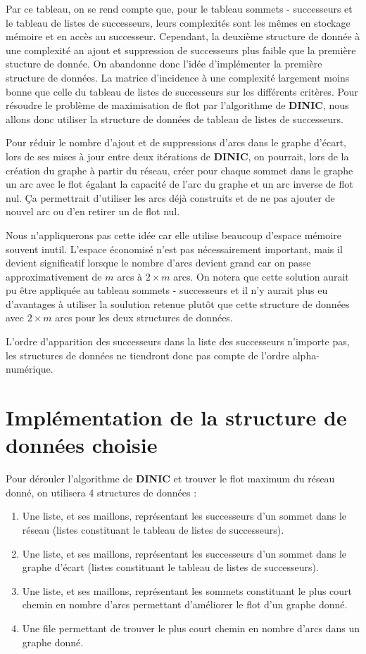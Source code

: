 \documentclass[11pt, a4paper]{report}
\begin{document}
	Par ce tableau, on se rend compte que, pour le tableau sommets - successeurs et le tableau de listes de successeurs, leurs complexités sont les mêmes en stockage mémoire et en accès au successeur. Cependant, la deuxième structure de donnée à une complexité an ajout et suppression de successeurs plus faible que la première stucture de donnée. On abandonne donc l'idée d'implémenter la première structure de données. La matrice d'incidence à une complexité largement moins bonne que celle du tableau de listes de successeurs sur les différents critères. Pour résoudre le problème de maximisation de flot par l'algorithme de \textbf{DINIC}, nous allons donc utiliser la structure de données de tableau de listes de successeurs.

    Pour réduir le nombre d'ajout et de suppressions d'arcs dans le graphe d'écart, lors de ses mises à jour entre deux itérations de \textbf{DINIC}, on pourrait, lors de la création du graphe à partir du réseau, créer pour chaque sommet dans le graphe un arc avec le flot égalant la capacité de l'arc du graphe et un arc inverse de flot nul. Ça permettrait d'utiliser les arcs déjà construits et de ne pas ajouter de nouvel arc ou d'en retirer un de flot nul.

    Nous n'appliquerons pas cette idée car elle utilise beaucoup d'espace mémoire souvent inutil. L'espace économisé n'est pas nécessairement important, mais il devient significatif lorsque le nombre d'arcs devient grand car on passe approximativement de $m$ arcs à $2 \times m$ arcs. On notera que cette solution aurait pu être appliquée au tableau sommets - successeurs et il n'y aurait plus eu d'avantages à utiliser la soulution retenue plutôt que cette structure de données avec $2 \times m$ arcs pour les deux structures de données.

    L'ordre d'apparition des successeurs dans la liste des successeurs n'importe pas, les structures de données ne tiendront donc pas compte de l'ordre alpha-numérique.

	\section{Implémentation de la structure de données choisie}

	Pour dérouler l'algorithme de \textbf{DINIC} et trouver le flot maximum du réseau donné, on utilisera 4 structures de données :
	\begin{enumerate}
		\item Une liste, et ses maillons, représentant les successeurs d'un sommet dans le réseau (listes constituant le tableau de listes de successeurs).
		\item Une liste, et ses maillons, représentant les successeurs d'un sommet dans le graphe d'écart (listes constituant le tableau de listes de successeurs).
		\item Une liste, et ses maillons, représentant les sommets constituant le plus court chemin en nombre d'arcs permettant d'améliorer le flot d'un graphe donné.
		\item Une file permettant de trouver le plus court chemin en nombre d'arcs dans un graphe donné.
	\end{enumerate}
\end{document}
